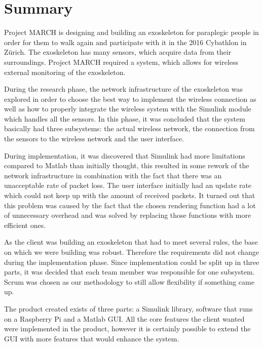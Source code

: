 \chapter*{Summary}
Project MARCH is designing and building an exoskeleton for paraplegic people in order for them to walk again and participate with it in the 2016 Cybathlon in Zürich.  
The exoskeleton has many sensors, which acquire data from their surroundings. Project MARCH required a system, which allows for wireless external monitoring of the exoskeleton.

During the research phase, the network infrastructure of the exoskeleton was explored in order to choose the best way to implement the wireless connection as well as how to properly integrate the wireless system with the Simulink module which handles all the sensors. In this phase, it was concluded that the system basically had three subsystems: the actual wireless network, the connection from the sensors to the wireless network and the user interface.

During implementation, it was discovered that Simulink had more limitations compared to Matlab than initially thought, this resulted in some rework of the network infrastructure in combination with the fact that there was an unacceptable rate of packet loss. The user interface initially had an update rate which could not keep up with the amount of received packets. It turned out that this problem was caused by the fact that the chosen rendering function had a lot of unnecessary overhead and was solved by replacing those functions with more efficient ones.

As the client was building an exoskeleton that had to meet several rules, the base on which we were building was robust. Therefore the requirements did not change during the implementation phase. Since implementation could be split up in three parts, it was decided that each team member was responsible for one subsystem. Scrum was chosen as our methodology to still allow flexibility if something came up.

The product created exists of three parts: a Simulink library, software that runs on a Raspberry Pi and a Matlab GUI. 
All the core features the client wanted were implemented in the product, however it is certainly possible to extend the GUI with more features that would enhance the system.


